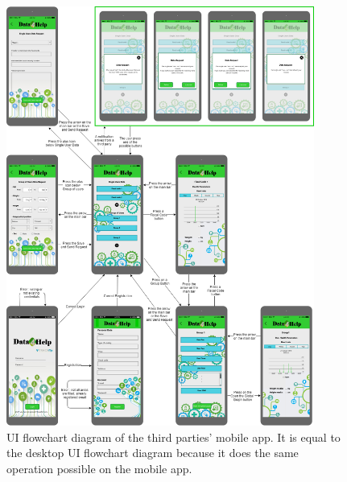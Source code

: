 \begin{figure}[h!]
	\centering
	\includegraphics[width=0.90\textwidth]{./pictures/tp_UI_flowchart_diagram.png}\par
	\caption{UI flowchart diagram of the third parties' mobile app. It is equal to the desktop UI flowchart diagram because it does the 		same operation possible on the mobile app.}
\end{figure}
\FloatBarrier
